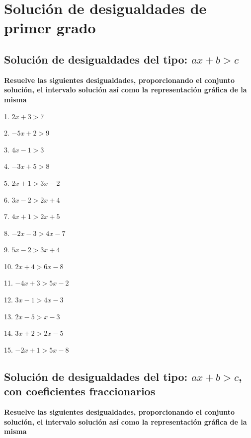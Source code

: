 \documentclass[]{book}
\begin{document}
\section{Solución de desigualdades de primer
grado}\label{soluciuxf3n-de-desigualdades-de-primer-grado}

\subsection{\texorpdfstring{Solución de desigualdades del tipo:
\(ax+b>c\)}{Solución de desigualdades del tipo: ax+b\textgreater{}c}}\label{soluciuxf3n-de-desigualdades-del-tipo-axbc}

\textbf{Resuelve las siguientes desigualdades, proporcionando el
conjunto solución, el intervalo solución así como la representación
gráfica de la misma}

\begin{multicols}{3}
1. $2x+3>7$

2. $-5x+2>9$

3. $4x-1>3$

4. $-3x+5>8$

5. $2x+1>3x-2$

6. $3x-2>2x+4$

7. $4x+1>2x+5$

8. $-2x-3>4x-7$

9. $5x-2>3x+4$

10. $2x+4>6x-8$

11. $-4x+3>5x-2$

12. $3x-1>4x-3$

13. $2x-5>x-3$

14. $3x+2>2x-5$

15. $-2x+1>5x-8$
\end{multicols}

\subsection{\texorpdfstring{Solución de desigualdades del tipo:
\(ax+b>c\), con coeficientes
fraccionarios}{Solución de desigualdades del tipo: ax+b\textgreater{}c, con coeficientes fraccionarios}}\label{soluciuxf3n-de-desigualdades-del-tipo-axbc-con-coeficientes-fraccionarios}

\textbf{Resuelve las siguientes desigualdades, proporcionando el
conjunto solución, el intervalo solución así como la representación
gráfica de la misma}
\end{document}
